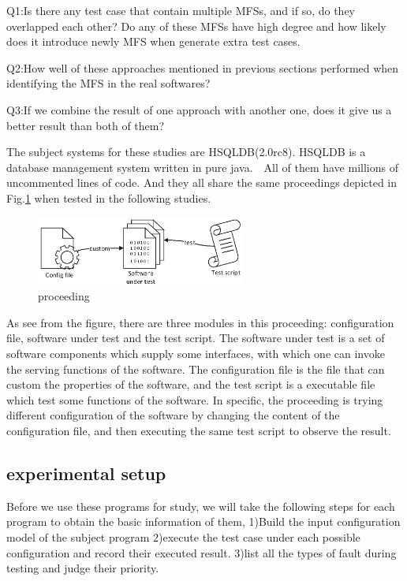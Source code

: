 \documentclass[10pt,journal,cspaper,compsoc]{IEEEtran}
\begin{document}
 Q1:Is there any test case that contain multiple MFSs, and if so, do they overlapped each other? Do any of these MFSs have high degree and how likely does it introduce newly MFS when generate extra test cases.

 Q2:How well of these approaches mentioned in previous sections performed when identifying the MFS in the real softwares?

 Q3:If we combine the result of one approach with another one, does it give us a better result than both of them?

The subject systems for these studies are HSQLDB(2.0rc8). HSQLDB is a database management system written in pure java.　All of them have millions of uncommented lines of code. And they all share the same proceedings depicted in Fig.\ref{proceeding} when tested in the following studies.
\begin{figure}
 \centering
 \includegraphics[width=2.7in]{proceed.eps}
 \caption{proceeding}
 \label{proceeding}
\end{figure}

As see from the figure, there are three modules in this proceeding: configuration file, software under test and the test script. The software under test is a set of software components which supply some interfaces, with which one can invoke the serving functions of the software. The configuration file is the file that can custom the properties of the software, and the test script is a executable file which test some functions of the software. In specific, the proceeding is trying different configuration of the software by changing the content of the configuration file, and then executing the same test script to observe the result.

\subsection{experimental setup}
Before we use these programs for study, we will take the following steps for each program to obtain the basic information of them, 1)Build the input configuration model of the subject program 2)execute the test case under each possible configuration and record their executed result. 3)list all the types of fault during testing and judge their priority.
\end{document}
